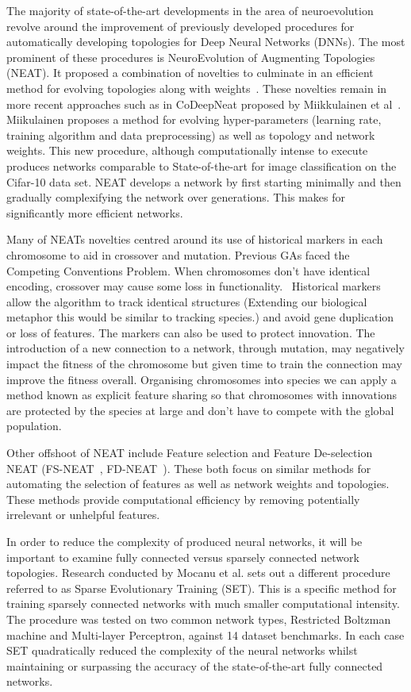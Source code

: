 \documentclass[]{monthly-report}
\begin{document}
The majority of state-of-the-art developments in the area of neuroevolution revolve around the improvement of previously developed procedures for automatically developing topologies for Deep Neural Networks (DNNs). The most prominent of these procedures is NeuroEvolution of Augmenting Topologies (NEAT). It proposed a combination of novelties to culminate in an efficient method for evolving topologies along with weights~\cite{Stanley:2002:ERL:2955491.2955578}. These novelties remain in more recent approaches such as in CoDeepNeat proposed by Miikkulainen et al~\cite{Miikkulainen2017}. Miikulainen proposes a method for evolving hyper-parameters (learning rate, training algorithm and data preprocessing) as well as topology and network weights. This new procedure, although computationally  intense to execute produces networks comparable to State-of-the-art for image classification on the Cifar-10 data set. NEAT develops a network by first starting minimally and then gradually complexifying the network over generations. This makes for significantly more efficient networks.

Many of NEATs novelties centred around its use of historical markers in each chromosome to aid in crossover and mutation. Previous GAs faced the Competing Conventions Problem. When chromosomes don't have identical encoding, crossover may cause some loss in functionality.~\cite{Radcliffe1993} Historical markers allow the algorithm to track identical structures (Extending our biological metaphor this would be similar to tracking species.) and avoid gene duplication or loss of features. The markers can also be used to protect innovation. The introduction of a new connection to a network, through mutation, may negatively impact the fitness of the chromosome but given time to train the connection may improve the fitness overall. Organising chromosomes into species we can apply a method known as explicit feature sharing so that chromosomes with innovations are protected by the species at large and don't have to compete with the global population. 

Other offshoot of NEAT include Feature selection and Feature De-selection NEAT (FS-NEAT~\cite{Whiteson20051225}, FD-NEAT~\cite{MP:MP3941}). These both focus on similar methods for automating the selection of features as well as network weights and topologies. These methods provide computational efficiency by removing potentially irrelevant or unhelpful features.

In order to reduce the complexity of produced neural networks, it will be important to examine fully connected versus sparsely connected network topologies. Research conducted by Mocanu et al.\cite{DBLP:journals/corr/MocanuMSNGL17} sets out a different procedure referred to as Sparse Evolutionary Training (SET). This is a specific method for training sparsely connected networks with much smaller computational intensity. The procedure was tested on two common network types, Restricted Boltzman machine and Multi-layer Perceptron, against 14 dataset benchmarks.  In each case SET quadratically reduced the complexity of the neural networks whilst maintaining or surpassing the accuracy of the state-of-the-art fully connected networks.
\end{document}
